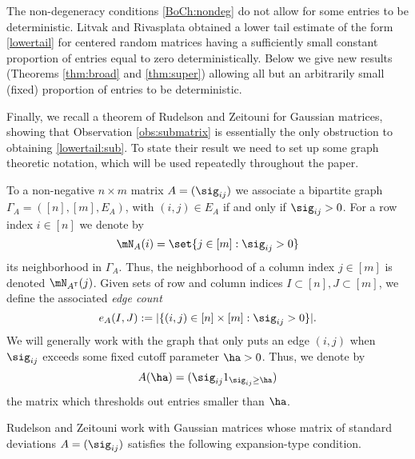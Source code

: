 \documentclass[aop,preprint]{imsart}
\theoremstyle{plain}
\theoremstyle{definition}
\theoremstyle{remark}
\numberwithin{equation}{section}
\numberwithin{theorem}{section}
\def \tran {\mathsf{T}}
\begin{document}
The non-degeneracy conditions \eqref{BoCh:nondeg} do not allow for some entries to be deterministic.
Litvak and Rivasplata \citep{LiRi} obtained a lower tail estimate of the form \eqref{lowertail} for centered random matrices having a sufficiently small constant proportion of entries equal to zero deterministically.
Below we give new results (Theorems \ref{thm:broad} and \ref{thm:super}) allowing all but an arbitrarily small (fixed) proportion of entries to be deterministic. 

Finally, we recall a theorem of Rudelson and Zeitouni \citep{RuZe} for Gaussian matrices, showing that Observation \ref{obs:submatrix} is essentially the only obstruction to obtaining \eqref{lowertail:sub}.
To state their result we need to set up some graph theoretic notation, which will be used repeatedly throughout the paper.

To a non-negative $n\times m$ matrix $A=(\sig_{ij})$ we associate a bipartite graph $\Gamma_A = ([n],[m], E_A)$, with $(i,j)\in E_A$ if and only if $\sig_{ij}>0$. 
For a row index $i\in [n]$ we denote by
\begin{equation}	\label{def:nbhd}
\mN_A(i) = \set{j\in [m]: \sig_{ij}>0}
\end{equation}
its neighborhood in $\Gamma_A$. 
Thus, the neighborhood of a column index $j\in [m]$ is denoted $\mN_{A^\tran}(j)$.
Given sets of row and column indices $I\subset [n], J\subset[m]$, we define the associated \emph{edge count}
\begin{equation}	\label{def:edges}
e_A(I,J) := |\{(i,j)\in [n]\times [m]: \sig_{ij}>0\}|.
\end{equation}
We will generally work with the graph that only puts an edge $(i,j)$ when $\sig_{ij}$ exceeds some fixed cutoff parameter $\ha>0$.
Thus, we denote by
\begin{equation}	\label{Aha}
A(\ha) = (\sig_{ij}1_{\sig_{ij}\ge \ha})
\end{equation}
the matrix which thresholds out entries smaller than $\ha$.

Rudelson and Zeitouni work with Gaussian matrices whose matrix of standard deviations $A=(\sig_{ij})$ satisfies the following expansion-type condition.
\end{document}
